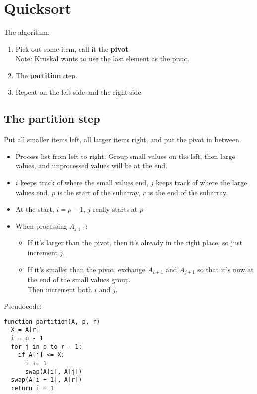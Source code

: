 \section{Quicksort}

The algorithm:
\begin{enumerate}
    \item Pick out some item, call it the \textbf{pivot}.\\
    Note: Kruskal wants to use the last element as the pivot.
    \item The \hyperref[sec:partition-step]{\textbf{partition}} step.
    \item Repeat on the left side and the right side.
\end{enumerate}

\subsection*{The partition step}\label{sec:partition-step}

Put all smaller items left, all larger items right, and put the pivot in between.
\begin{itemize}
    \item Process list from left to right. Group small values on the left, then large values, and unprocessed values will be at the end.
    \item $i$ keeps track of where the small values end, $j$ keeps track of where the large values end. $p$ is the start of the subarray, $r$ is the end of the subarray.
    \item At the start, $i = p-1$, $j$ really starts at $p$
    \item When processing $A_{j+1}$:
    \begin{itemize}
        \item If it's larger than the pivot, then it's already in the right place, so just increment $j$.
        \item If it's smaller than the pivot, exchange $A_{i+1}$ and $A_{j+1}$ so that it's now at the end of the small values group.\\
        Then increment both $i$ and $j$.
    \end{itemize}
\end{itemize}

Pseudocode:
\begin{verbatim}
function partition(A, p, r)
  X = A[r]
  i = p - 1
  for j in p to r - 1:
    if A[j] <= X:
      i += 1
      swap(A[i], A[j])
  swap(A[i + 1], A[r])
  return i + 1
\end{verbatim}

